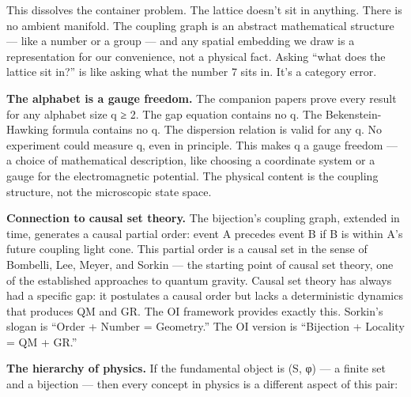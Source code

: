 \documentclass[
]{article}
\begin{document}
This dissolves the container problem. The lattice doesn't sit in
anything. There is no ambient manifold. The coupling graph is an
abstract mathematical structure --- like a number or a group --- and any
spatial embedding we draw is a representation for our convenience, not a
physical fact. Asking ``what does the lattice sit in?'' is like asking
what the number 7 sits in. It's a category error.

\textbf{The alphabet is a gauge freedom.} The companion papers prove
every result for any alphabet size q ≥ 2. The gap equation contains no
q. The Bekenstein-Hawking formula contains no q. The dispersion relation
is valid for any q. No experiment could measure q, even in principle.
This makes q a gauge freedom --- a choice of mathematical description,
like choosing a coordinate system or a gauge for the electromagnetic
potential. The physical content is the coupling structure, not the
microscopic state space.

\textbf{Connection to causal set theory.} The bijection's coupling
graph, extended in time, generates a causal partial order: event A
precedes event B if B is within A's future coupling light cone. This
partial order is a causal set in the sense of Bombelli, Lee, Meyer, and
Sorkin --- the starting point of causal set theory, one of the
established approaches to quantum gravity. Causal set theory has always
had a specific gap: it postulates a causal order but lacks a
deterministic dynamics that produces QM and GR. The OI framework
provides exactly this. Sorkin's slogan is ``Order + Number = Geometry.''
The OI version is ``Bijection + Locality = QM + GR.''

\textbf{The hierarchy of physics.} If the fundamental object is (S, φ)
--- a finite set and a bijection --- then every concept in physics is a
different aspect of this pair:
\end{document}

